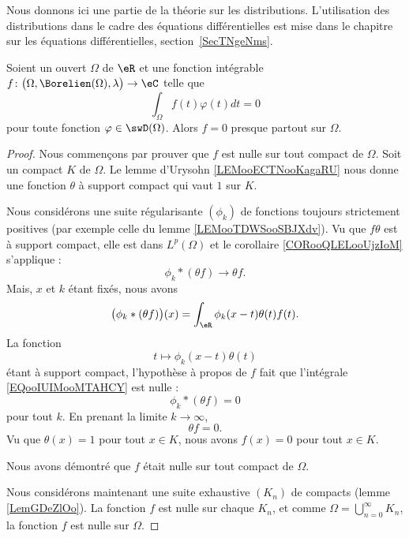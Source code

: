 
Nous donnons ici une partie de la théorie sur les distributions. L'utilisation des distributions dans le cadre des équations différentielles est mise dans le chapitre sur les équations différentielles, section~\ref{SecTNgeNms}.

\begin{proposition} \label{PropAAjSURG}
    Soient un ouvert \( \Omega\) de \( \eR\) et une fonction intégrable \( f\colon \big( \Omega,\Borelien(\Omega),\lambda \big)\to \eC\) telle que
    \begin{equation}
        \int_{\Omega}f(t)\varphi(t)dt=0
    \end{equation}
    pour toute fonction \( \varphi\in\swD(\Omega)\). Alors \( f=0\) presque partout sur \( \Omega\).
\end{proposition}

\begin{proof}
    Nous commençons par prouver que \( f\) est nulle sur tout compact de \( \Omega\). Soit un compact \( K\) de \( \Omega\). Le lemme d'Urysohn \ref{LEMooECTNooKagaRU} nous donne une fonction \( \theta\) à support compact qui vaut \( 1\) sur \( K\).

    Nous considérons une suite régularisante \( (\phi_k)\) de fonctions toujours strictement positives (par exemple celle du lemme \ref{LEMooTDWSooSBJXdv}). Vu que \( f\theta\) est à support compact, elle est dans \( L^p(\Omega)\) et le corollaire \ref{CORooQLELooUjzIoM} s'applique :
    \begin{equation}
        \phi_k*(\theta f)\to \theta f.
    \end{equation}
    Mais, \( x\) et \( k\) étant fixés, nous avons
    \begin{equation}        \label{EQooIUIMooMTAHCY}
        \big( \phi_k* (\theta f) \big)(x)=\int_{\eR}\phi_k(x-t)\theta(t)f(t).
    \end{equation}
    La fonction
    \begin{equation}
        t\mapsto \phi_k(x-t)\theta(t)
    \end{equation}
    étant à support compact, l'hypothèse à propos de \( f\) fait que l'intégrale \eqref{EQooIUIMooMTAHCY} est nulle :
    \begin{equation}
        \phi_k*(\theta f)=0
    \end{equation}
    pour tout \( k\). En prenant la limite \( k\to \infty\),
    \begin{equation}
        \theta f=0.
    \end{equation}
    Vu que \( \theta(x)=1\) pour tout \( x\in K\), nous avons \( f(x)=0\) pour tout \( x\in K\).

    Nous avons démontré que \( f\) était nulle sur tout compact de \( \Omega\).

    Nous considérons maintenant une suite exhaustive \( (K_n)\) de compacts (lemme \ref{LemGDeZlOo}). La fonction \( f\) est nulle sur chaque \( K_n\), et comme \( \Omega=\bigcup_{n=0}^{\infty}K_n\), la fonction \( f\) est nulle sur \( \Omega\).
\end{proof}

